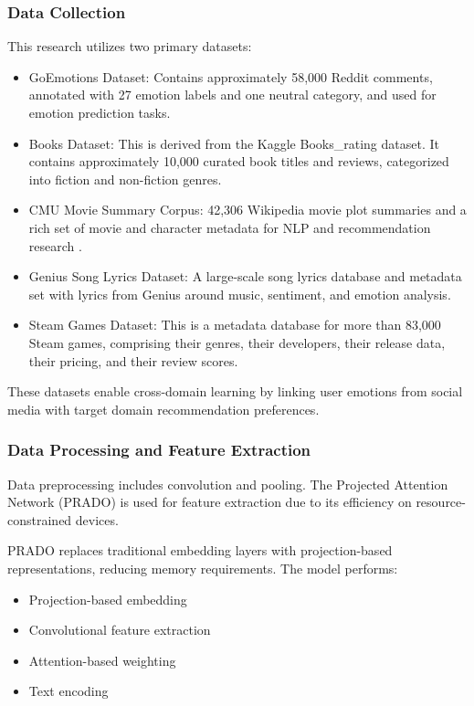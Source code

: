\subsubsection{Data Collection}
This research utilizes two primary datasets:

\begin{itemize}
    \item GoEmotions Dataset: Contains approximately 58,000 Reddit comments, annotated with 27 emotion labels and one neutral category, and used for emotion prediction tasks.
    \item Books Dataset: This is derived from the Kaggle Books\_rating dataset. It contains approximately 10,000 curated book titles and reviews, categorized into fiction and non-fiction genres.
    \item CMU Movie Summary Corpus: 42,306 Wikipedia movie plot summaries and a rich set of movie and character metadata for NLP and recommendation research \cite{ref95}.
    \item Genius Song Lyrics Dataset: A large-scale song lyrics database and metadata set with lyrics from Genius around music, sentiment, and emotion analysis.
    \item Steam Games Dataset: This is a metadata database for more than 83,000 Steam games, comprising their genres, their developers, their release data, their pricing, and their review scores.
\end{itemize}

These datasets enable cross-domain learning by linking user emotions from social media with target domain recommendation preferences.

\subsubsection{Data Processing and Feature Extraction}
Data preprocessing includes convolution and pooling. The Projected Attention Network (PRADO) is used for feature extraction due to its efficiency on resource-constrained devices.

PRADO replaces traditional embedding layers with projection-based representations, reducing memory requirements. The model performs:

\begin{itemize}
    \item Projection-based embedding
    \item Convolutional feature extraction
    \item Attention-based weighting
    \item Text encoding
\end{itemize}

